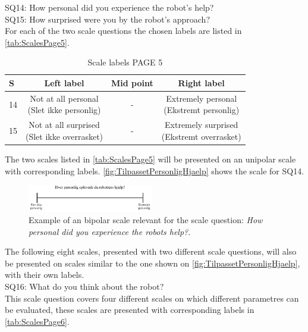 \noindent
% 
SQ14: How personal did you experience the robot's help?\\%
SQ15: How surprised were you by the robot's approach?\\%
For each of the two scale questions the chosen labels are listed in \autoref{tab:ScalesPage5}. 
%
\begin{table}[H]
	\centering
\caption{Scale labels PAGE 5}
	\label{tab:ScalesPage5} 
	\begin{tabular}{l|c|c|c}
		S     & Left label & Mid point & Right label \\\hline
		14   & \makecell{Not at all personal\\(Slet ikke personlig)}  & - & \makecell{Extremely personal\\(Ekstremt personlig)}        \\\hline
		15   & \makecell{Not at all surprised\\(Slet ikke overrasket)} & - & \makecell{Extremely surprised \\(Ekstremt overrasket)}               
	\end{tabular}        
\end{table}
\noindent
%
The two scales listed in \autoref{tab:ScalesPage5} will be presented on an unipolar scale with corresponding labels. \autoref{fig:TilpassetPersonligHjaelp} shows the scale for SQ14. 
%
\begin{figure}[H]
\centering
\includegraphics[width = 0.49\textwidth]{Figure/TilpassetPersonligHjaelp}
\setlength{} 
\caption{Example of an bipolar scale relevant for the scale question: \textit{How personal did you experience the robots help?}.}
\label{fig:TilpassetPersonligHjaelp}
\end{figure}
\noindent
% 
The following eight scales, presented with two different scale questions, will also be presented on scales similar to the one shown on \autoref{fig:TilpassetPersonligHjaelp}, with their own labels. \\  
SQ16: What do you think about the robot?\\%
This scale question covers four different scales on which different parametres can be evaluated, these scales are presented with corresponding labels in \autoref{tab:ScalesPage6}. 
